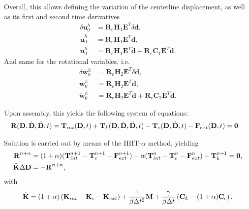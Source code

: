 \documentclass[3p]{elsarticle}
\newcommand{\vect}[1]{\boldsymbol{#1}}
\begin{document}
Overall, this allows defining the variation of the centerline displacement, as well as its first and second time derivatives
\begin{align}
	\delta\vect{u}_0^h &= \vect{R}_e\vect{H}_1\vect{E}^T\delta\vect{d},\label{eq:delta-u0h}\\
	\dot{\vect{u}}_0^h &= \vect{R}_e\vect{H}_1\vect{E}^T\dot{\vect{d}},\label{eq:u0hdot-intro}\\
	\ddot{\vect{u}}_0^h &= \vect{R}_e\vect{H}_1\vect{E}^T\ddot{\vect{d}}+\vect{R}_e\vect{C}_1\vect{E}^T\dot{\vect{d}}.\label{eq:u0hddot-intro}
\end{align}
\noindent And same for the rotational variables, i.e.
\begin{align}
	\delta\vect{w}_0^h&=\vect{R}_e\vect{H}_2\vect{E}^T\delta\vect{d}\label{eq:delta-w0h},\\
	\dot{\vect{w}}_0^h&=\vect{R}_e\vect{H}_2\vect{E}^T\dot{\vect{d}},\label{eq:dotw-intro}\\
	\ddot{\vect{w}}_0^h&=\vect{R}_e\vect{H}_2\vect{E}^T\ddot{\vect{d}}+\vect{R}_e\vect{C}_2\vect{E}^T\dot{\vect{d}}.\label{eq:ddotw-intro}
\end{align}

Upon assembly, this yields the following system of equations:
\begin{align}
	\textrm{\textbf{R}}(\textrm{\textbf{D}},\dot{\textrm{\textbf{D}}},\ddot{\textrm{\textbf{D}}},t) &= \textrm{\textbf{T}}_{int}(\textrm{\textbf{D}},t) + \textrm{\textbf{T}}_k(\textrm{\textbf{D}},\dot{\textrm{\textbf{D}}},\ddot{\textrm{\textbf{D}}},t) -  \textrm{\textbf{T}}_c(\textrm{\textbf{D}},\dot{\textrm{\textbf{D}}},t) - \textrm{\textbf{F}}_{ext}(\textrm{\textbf{D}},t)=\vect{0}\label{eq:discrete-residual}
\end{align}

Solution is carried out by means of the HHT-$\alpha$ method, yielding
\begin{align}
	\textrm{\textbf{R}}^{n+\alpha}&=(1+\alpha)(\textrm{\textbf{T}}_{int}^{n+1}-\textrm{\textbf{T}}_{c}^{n+1}-\textrm{\textbf{F}}_{ext}^{n+1})-\alpha(\textrm{\textbf{T}}_{int}^{n}-\textrm{\textbf{T}}_{c}^{n}-\textrm{\textbf{F}}_{ext}^{n})+\textrm{\textbf{T}}_{k}^{n+1}=\vect{0},\label{eq:Rnalpha}\\
	\tilde{\textrm{\textbf{K}}}\Delta\textrm{\textbf{D}} &= -\textrm{\textbf{R}}^{n+\alpha},\label{eq:residual-algebraic}
\end{align}
\noindent with
\begin{align}
	\tilde{\textrm{\textbf{K}}}=(1+\alpha)\left(\textrm{\textbf{K}}_{int}-\textrm{\textbf{K}}_{c}-\textrm{\textbf{K}}_{ext}\right)+\frac{1}{\beta\Delta t^2}\textrm{\textbf{M}}+\frac{\gamma}{\beta\Delta t}\left(\textrm{\textbf{C}}_k-(1+\alpha)\textrm{\textbf{C}}_c\right).
\end{align}
\end{document}
